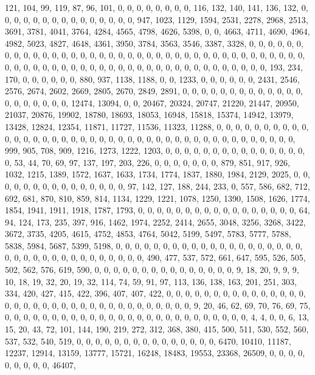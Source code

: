 \documentclass[
]{article}
\begin{document}
121, 104, 99, 119, 87, 96, 101, 0, 0, 0, 0, 0, 0, 0, 0, 116, 132, 140,
141, 136, 132, 0, 0, 0, 0, 0, 0, 0, 0, 0, 0, 0, 0, 0, 0, 0, 947, 1023,
1129, 1594, 2531, 2278, 2968, 2513, 3691, 3781, 4041, 3764, 4284, 4565,
4798, 4626, 5398, 0, 0, 4663, 4711, 4690, 4964, 4982, 5023, 4827, 4648,
4361, 3950, 3784, 3563, 3546, 3387, 3328, 0, 0, 0, 0, 0, 0, 0, 0, 0, 0,
0, 0, 0, 0, 0, 0, 0, 0, 0, 0, 0, 0, 0, 0, 0, 0, 0, 0, 0, 0, 0, 0, 0, 0,
0, 0, 0, 0, 0, 0, 0, 0, 0, 0, 0, 0, 0, 0, 0, 0, 0, 0, 0, 0, 0, 0, 0, 0,
0, 0, 0, 0, 0, 0, 0, 0, 193, 234, 170, 0, 0, 0, 0, 0, 0, 880, 937, 1138,
1188, 0, 0, 1233, 0, 0, 0, 0, 0, 0, 2431, 2546, 2576, 2674, 2602, 2669,
2805, 2670, 2849, 2891, 0, 0, 0, 0, 0, 0, 0, 0, 0, 0, 0, 0, 0, 0, 0, 0,
0, 0, 0, 0, 12474, 13094, 0, 0, 20467, 20324, 20747, 21220, 21447,
20950, 21037, 20876, 19902, 18780, 18693, 18053, 16948, 15818, 15374,
14942, 13979, 13428, 12824, 12354, 11871, 11727, 11536, 11323, 11288, 0,
0, 0, 0, 0, 0, 0, 0, 0, 0, 0, 0, 0, 0, 0, 0, 0, 0, 0, 0, 0, 0, 0, 0, 0,
0, 0, 0, 0, 0, 0, 0, 0, 0, 0, 0, 0, 0, 0, 0, 0, 999, 905, 708, 909,
1216, 1273, 1222, 1203, 0, 0, 0, 0, 0, 0, 0, 0, 0, 0, 0, 0, 0, 0, 0, 0,
53, 44, 70, 69, 97, 137, 197, 203, 226, 0, 0, 0, 0, 0, 0, 0, 879, 851,
917, 926, 1032, 1215, 1389, 1572, 1637, 1633, 1734, 1774, 1837, 1880,
1984, 2129, 2025, 0, 0, 0, 0, 0, 0, 0, 0, 0, 0, 0, 0, 0, 0, 0, 97, 142,
127, 188, 244, 233, 0, 557, 586, 682, 712, 692, 681, 870, 810, 859, 814,
1134, 1229, 1221, 1078, 1250, 1390, 1508, 1626, 1774, 1854, 1941, 1911,
1918, 1787, 1793, 0, 0, 0, 0, 0, 0, 0, 0, 0, 0, 0, 0, 0, 0, 0, 0, 0, 64,
94, 124, 173, 235, 397, 916, 1462, 1974, 2252, 2414, 2655, 3048, 3256,
3268, 3422, 3672, 3735, 4205, 4615, 4752, 4853, 4764, 5042, 5199, 5497,
5783, 5777, 5788, 5838, 5984, 5687, 5399, 5198, 0, 0, 0, 0, 0, 0, 0, 0,
0, 0, 0, 0, 0, 0, 0, 0, 0, 0, 0, 0, 0, 0, 0, 0, 0, 0, 0, 0, 0, 0, 0, 0,
0, 0, 0, 490, 477, 537, 572, 661, 647, 595, 526, 505, 502, 562, 576,
619, 590, 0, 0, 0, 0, 0, 0, 0, 0, 0, 0, 0, 0, 0, 0, 0, 9, 18, 20, 9, 9,
9, 10, 18, 19, 32, 20, 19, 32, 114, 74, 59, 91, 97, 113, 136, 138, 163,
201, 251, 303, 334, 420, 427, 415, 422, 396, 407, 407, 422, 0, 0, 0, 0,
0, 0, 0, 0, 0, 0, 0, 0, 0, 0, 0, 0, 0, 0, 0, 0, 0, 0, 0, 0, 0, 0, 0, 0,
0, 0, 0, 0, 0, 0, 0, 9, 20, 46, 62, 69, 70, 76, 69, 75, 0, 0, 0, 0, 0,
0, 0, 0, 0, 0, 0, 0, 0, 0, 0, 0, 0, 0, 0, 0, 0, 0, 0, 0, 0, 0, 4, 4, 0,
0, 6, 13, 15, 20, 43, 72, 101, 144, 190, 219, 272, 312, 368, 380, 415,
500, 511, 530, 552, 560, 537, 532, 540, 519, 0, 0, 0, 0, 0, 0, 0, 0, 0,
0, 0, 0, 0, 0, 0, 6470, 10410, 11187, 12237, 12914, 13159, 13777, 15721,
16248, 18483, 19553, 23368, 26509, 0, 0, 0, 0, 0, 0, 0, 0, 0, 46407,
\end{document}

